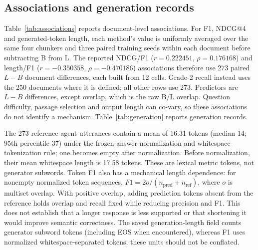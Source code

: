 \subsection{Associations and generation records}
Table~\ref{tab:associations} reports document-level associations. For F1, NDCG@4 and generated-token length, each method's value is uniformly averaged over the same four chunkers and three paired training seeds within each document before subtracting B from L. The reported NDCG/F1 ($r=0.222451$, $\rho=0.176168$) and length/F1 ($r=-0.350358$, $\rho=-0.470186$) associations therefore use 273 paired $L-B$ document differences, each built from 12 cells. Grade-2 recall instead uses the 250 documents where it is defined; all other rows use 273. Predictors are $L-B$ differences, except overlap, which is the raw B/L overlap. Question difficulty, passage selection and output length can co-vary, so these associations do not identify a mechanism. Table~\ref{tab:generation} reports generation records.

The 273 reference agent utterances contain a mean of 16.31 tokens (median 14; 95th percentile 37) under the frozen answer-normalization and whitespace-tokenization rule; one becomes empty after normalization. Before normalization, their mean whitespace length is 17.58 tokens. These are lexical metric tokens, not generator subwords. Token F1 also has a mechanical length dependence: for nonempty normalized token sequences, $F1=2o/(n_{\mathrm{pred}}+n_{\mathrm{ref}})$, where $o$ is multiset overlap. With positive overlap, adding prediction tokens absent from the reference holds overlap and recall fixed while reducing precision and F1. This does not establish that a longer response is less supported or that shortening it would improve semantic correctness. The saved generation-length field counts generator subword tokens (including EOS when encountered), whereas F1 uses normalized whitespace-separated tokens; these units should not be conflated.

